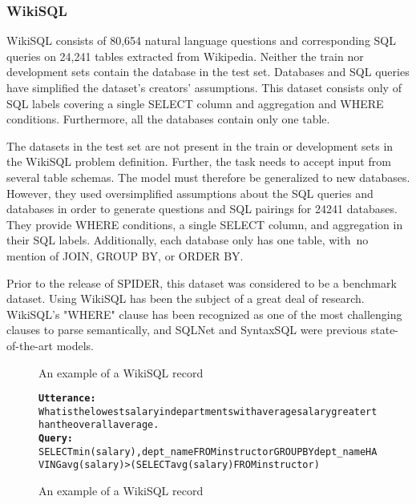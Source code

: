 \subsubsection{WikiSQL}

WikiSQL\cite{DBLP:journals/corr/abs-1902-01069} consists of 80,654 natural language questions and corresponding SQL queries on 24,241 tables extracted from Wikipedia. Neither the train nor development sets contain the database in the test set. Databases and SQL queries have simplified the dataset's creators' assumptions. This dataset consists only of SQL labels covering a single SELECT column and aggregation and WHERE conditions. Furthermore, all the databases contain only one table.

The datasets in the test set are not present in the train or development sets in the WikiSQL problem definition. Further, the task needs to accept input from several table schemas. The model must therefore be generalized to new databases. However, they used oversimplified assumptions about the SQL queries and databases in order to generate questions and SQL pairings for 24241 databases. They provide WHERE conditions, a single SELECT column, and aggregation in their SQL labels. Additionally, each database only has one table, with no mention of JOIN, GROUP BY, or ORDER BY.

Prior to the release of SPIDER, this dataset was considered to be a benchmark dataset. Using WikiSQL has been the subject of a great deal of research. WikiSQL's "WHERE" clause has been recognized as one of the most challenging clauses to parse semantically, and SQLNet and SyntaxSQL were previous state-of-the-art models.




\begin{figure}[H]
    \label{fig:WikiSQL}
    \begin{AIbox}{An example of a WikiSQL record}
        \vspace{-5px}
        \parbox{1\textwidth}{\scriptsize
        \begin{alltt} 
            {\bf Utterance:} \\ 
            What is the lowest salary in departments with average salary greater than the overall average.
            \\
            {\bf Query:} \\
            SELECT min(salary) ,  dept\_name FROM instructor GROUP BY dept\_name HAVING avg(salary)  >  (SELECT avg(salary) FROM instructor)
        \end{alltt}
        }
        \vspace{-5px}
    \end{AIbox}
    \caption{An example of a WikiSQL record}
  \end{figure}

